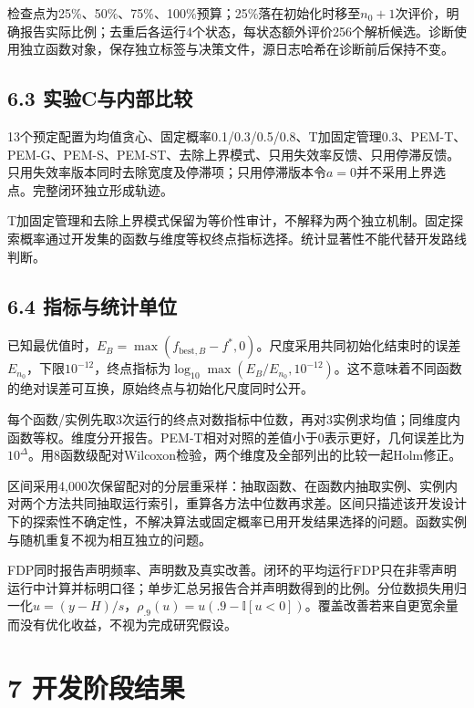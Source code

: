 \documentclass[11pt,a4paper]{article}
\begin{document}
检查点为25\%、50\%、75\%、100\%预算；25\%落在初始化时移至\(n_0+1\)次评价，明确报告实际比例；去重后各运行4个状态，每状态额外评价256个解析候选。诊断使用独立函数对象，保存独立标签与决策文件，源日志哈希在诊断前后保持不变。

\hypertarget{ux5b9eux9a8ccux4e0eux5185ux90e8ux6bd4ux8f83}{%
\subsection{6.3
实验C与内部比较}\label{ux5b9eux9a8ccux4e0eux5185ux90e8ux6bd4ux8f83}}

13个预定配置为均值贪心、固定概率0.1/0.3/0.5/0.8、T加固定管理0.3、PEM-T、PEM-G、PEM-S、PEM-ST、去除上界模式、只用失效率反馈、只用停滞反馈。只用失效率版本同时去除宽度及停滞项；只用停滞版本令\(a=0\)并不采用上界选点。完整闭环独立形成轨迹。

T加固定管理和去除上界模式保留为等价性审计，不解释为两个独立机制。固定探索概率通过开发集的函数与维度等权终点指标选择。统计显著性不能代替开发路线判断。

\hypertarget{ux6307ux6807ux4e0eux7edfux8ba1ux5355ux4f4d}{%
\subsection{6.4
指标与统计单位}\label{ux6307ux6807ux4e0eux7edfux8ba1ux5355ux4f4d}}

已知最优值时，\(E_B=\max(f_{\mathrm{best},B}-f^*,0)\)。尺度采用共同初始化结束时的误差\(E_{n_0}\)，下限\(10^{-12}\)，终点指标为\(\log_{10}\max(E_B/E_{n_0},10^{-12})\)。这不意味着不同函数的绝对误差可互换，原始终点与初始化尺度同时公开。

每个函数/实例先取3次运行的终点对数指标中位数，再对3实例求均值；同维度内函数等权。维度分开报告。PEM-T相对对照的差值小于0表示更好，几何误差比为\(10^\Delta\)。用8函数级配对Wilcoxon检验，两个维度及全部列出的比较一起Holm修正。

区间采用4,000次保留配对的分层重采样：抽取函数、在函数内抽取实例、实例内对两个方法共同抽取运行索引，重算各方法中位数再求差。区间只描述该开发设计下的探索性不确定性，不解决算法或固定概率已用开发结果选择的问题。函数实例与随机重复不视为相互独立的问题。

FDP同时报告声明频率、声明数及真实改善。闭环的平均运行FDP只在非零声明运行中计算并标明口径；单步汇总另报告合并声明数得到的比例。分位数损失用归一化\(u=(y-H)/s\)，\(\rho_{.9}(u)=u(.9-\mathbb I[u<0])\)。覆盖改善若来自更宽余量而没有优化收益，不视为完成研究假设。

\hypertarget{ux5f00ux53d1ux9636ux6bb5ux7ed3ux679c}{%
\section{7 开发阶段结果}\label{ux5f00ux53d1ux9636ux6bb5ux7ed3ux679c}}
\end{document}
